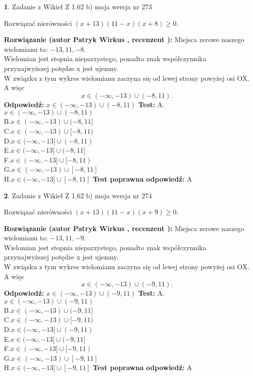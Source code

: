 \documentclass[12pt, a4paper]{article}
\theoremstyle{definition} %
\newtheorem{zad}{}
\newcommand{\zadStart}[1]{\begin{zad}#1\newline}
\newcommand{\zadStop}{\end{zad}}
\newcommand{\rozwStart}[2]{\noindent \textbf{Rozwiązanie (autor #1 , recenzent #2): }\newline}
\newcommand{\rozwStop}{\newline}
\newcommand{\odpStart}{\noindent \textbf{Odpowiedź:}\newline}
\newcommand{\odpStop}{\newline}
\newcommand{\testStart}{\noindent \textbf{Test:}\newline}
\newcommand{\testStop}{\newline}
\newcommand{\kluczStart}{\noindent \textbf{Test poprawna odpowiedź:}\newline}
\newcommand{\kluczStop}{\newline}
\begin{document}
\zadStart{Zadanie z Wikieł Z 1.62 b) moja wersja nr 273}

Rozwiązać nierówności $(x+13)(11-x)(x+8)\ge0$.
\zadStop
\rozwStart{Patryk Wirkus}{}
Miejsca zerowe naszego wielomianu to: $-13, 11, -8$.\\
Wielomian jest stopnia nieparzystego, ponadto znak współczynnika przy\linebreak najwyższej potędze x jest ujemny.\\ W związku z tym wykres wielomianu zaczyna się od lewej strony powyżej osi OX. A więc $$x \in (-\infty,-13) \cup (-8,11).$$
\rozwStop
\odpStart
$x \in (-\infty,-13) \cup (-8,11)$
\odpStop
\testStart
A.$x \in (-\infty,-13) \cup (-8,11)$\\
B.$x \in (-\infty,-13) \cup (-8,11]$\\
C.$x \in (-\infty,-13) \cup [-8,11)$\\
D.$x \in (-\infty,-13] \cup (-8,11)$\\
E.$x \in (-\infty,-13] \cup (-8,11]$\\
F.$x \in (-\infty,-13] \cup [-8,11)$\\
G.$x \in (-\infty,-13) \cup [-8,11]$\\
H.$x \in (-\infty,-13] \cup [-8,11]$
\testStop
\kluczStart
A
\kluczStop



\zadStart{Zadanie z Wikieł Z 1.62 b) moja wersja nr 274}

Rozwiązać nierówności $(x+13)(11-x)(x+9)\ge0$.
\zadStop
\rozwStart{Patryk Wirkus}{}
Miejsca zerowe naszego wielomianu to: $-13, 11, -9$.\\
Wielomian jest stopnia nieparzystego, ponadto znak współczynnika przy\linebreak najwyższej potędze x jest ujemny.\\ W związku z tym wykres wielomianu zaczyna się od lewej strony powyżej osi OX. A więc $$x \in (-\infty,-13) \cup (-9,11).$$
\rozwStop
\odpStart
$x \in (-\infty,-13) \cup (-9,11)$
\odpStop
\testStart
A.$x \in (-\infty,-13) \cup (-9,11)$\\
B.$x \in (-\infty,-13) \cup (-9,11]$\\
C.$x \in (-\infty,-13) \cup [-9,11)$\\
D.$x \in (-\infty,-13] \cup (-9,11)$\\
E.$x \in (-\infty,-13] \cup (-9,11]$\\
F.$x \in (-\infty,-13] \cup [-9,11)$\\
G.$x \in (-\infty,-13) \cup [-9,11]$\\
H.$x \in (-\infty,-13] \cup [-9,11]$
\testStop
\kluczStart
A
\kluczStop
\end{document}
